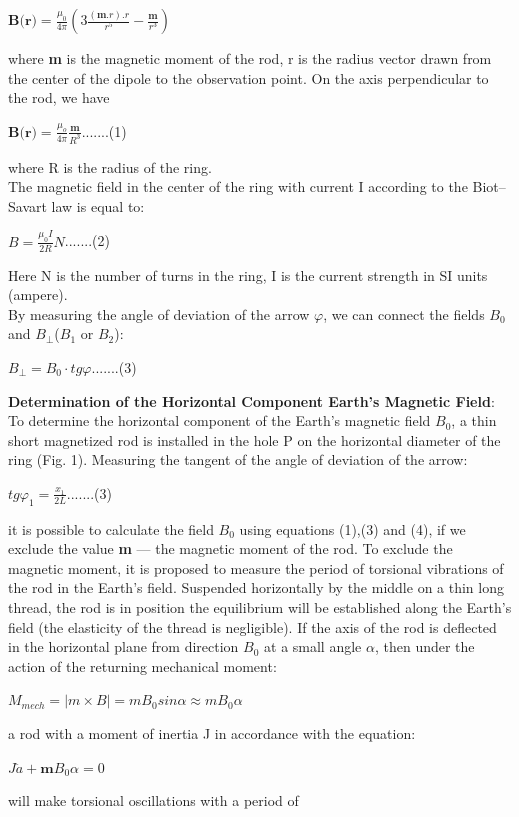 \documentclass[a4paper, 12pt]{article}%
\begin{document}
\begin{center}
$\textbf{B(r)} = \frac{\mu_0}{4\pi}(3\frac{(\textbf{m}.r).r}{r^5}-\frac{\textbf{m}}{r^3}) $
\end{center}
where \textbf{m} is the magnetic moment of the rod, r is the radius vector drawn from the center of the dipole to the observation point. On the axis perpendicular to the rod, we have
\begin{center}
$\textbf{B(r)} = \frac{\mu_o}{4\pi}\frac{\textbf{m}}{R^3}$.......(1)
\end{center}
where R is the radius of the ring.\\
\newline
The magnetic field in the center of the ring with current I according to the Biot–Savart law is equal to:
\begin{center}
$B = \frac{\mu_0I}{2R}N$.......(2)
\end{center}
Here N is the number of turns in the ring, I is the current strength in SI units (ampere).\\
\newline
By measuring the angle of deviation of the arrow $\varphi$, we can connect the fields $B_0$ and $B_{\perp}$($B_1$ or $B_2$):
\begin{center}
$B_{\perp}=B_0 \cdot tg\varphi$.......(3)
\end{center}
\textbf{Determination of the Horizontal Component Earth's Magnetic Field}:\\
\newline
To determine the horizontal component of the Earth's magnetic field $B_0$, a thin short magnetized rod is installed in the hole P on the horizontal diameter of the ring (Fig. 1). Measuring the tangent of the angle of deviation of the arrow:
\begin{center}
$tg\varphi_1=\frac{x_1}{2L}$.......(3)
\end{center}
it is possible to calculate the field $B_0$ using equations (1),(3) and (4), if we exclude the value \textbf{m} — the magnetic moment of the rod. To exclude the magnetic moment, it is proposed to measure the period of torsional vibrations of the rod in the Earth's field. Suspended horizontally by the middle on a thin long thread, the rod is in position the equilibrium will be established along the Earth's field (the elasticity of the thread is negligible). If the axis of the rod is deflected in the horizontal plane from direction $B_0$ at a small angle $\alpha$, then under the action of the returning mechanical moment:
\begin{center}
$ M_{mech} = | m \times B| = mB_0sin\alpha \approx mB_0\alpha $
\end{center}
a rod with a moment of inertia J in accordance with the equation:
\begin{center}
$J\ddot{a} + \textbf{m}B_0\alpha = 0$
\end{center}
will make torsional oscillations with a period of
\end{document}
